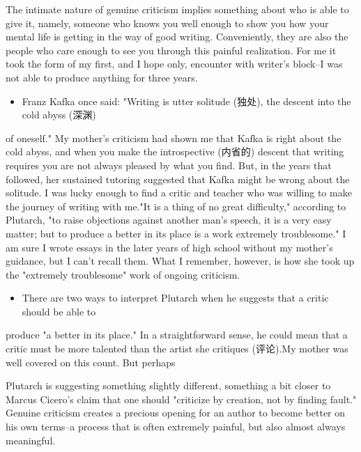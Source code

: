 \documentclass[UTF8,11pt]{ctexart}
\begin{document}
The intimate nature of genuine criticism implies something about who is able to give it, namely, someone who knows you well enough to show you how your mental life is getting in the way of good writing. Conveniently, they are also the people who care enough to see you through this painful realization. For me it took the form of my first, and I hope only, encounter with writer's block--I was not able to produce anything for three years.


\begin{itemize}[leftmargin=2em,itemsep=.2em,topsep=.4em]\item[F.] Franz Kafka once said: "Writing is utter solitude (独处), the descent into the cold abyss (深渊)
\end{itemize}

of oneself." My mother's criticism had shown me that Kafka is right about the cold abyss, and when you make the introspective (内省的) descent that writing requires you are not always pleased by what you find. But, in the years that followed, her sustained tutoring suggested that Kafka might be wrong about the solitude. I was lucky enough to find a critic and teacher who was willing to make the journey of writing with me."It is a thing of no great difficulty," according to Plutarch, "to raise objections against another man's speech, it is a very easy matter; but to produce a better in its place is a work extremely troublesome." I am sure I wrote essays in the later years of high school without my mother's guidance, but I can't recall them. What I remember, however, is how she took up the "extremely troublesome" work of ongoing criticism.


\begin{itemize}[leftmargin=2em,itemsep=.2em,topsep=.4em]\item[G.] There are two ways to interpret Plutarch when he suggests that a critic should be able to
\end{itemize}

produce "a better in its place." In a straightforward sense, he could mean that a critic must be more talented than the artist she critiques (评论).My mother was well covered on this count. But perhaps


Plutarch is suggesting something slightly different, something a bit closer to Marcus Cicero's claim that one should "criticize by creation, not by finding fault." Genuine criticism creates a precious opening for an author to become better on his own terms--a process that is often extremely painful, but also almost always meaningful.
\end{document}
